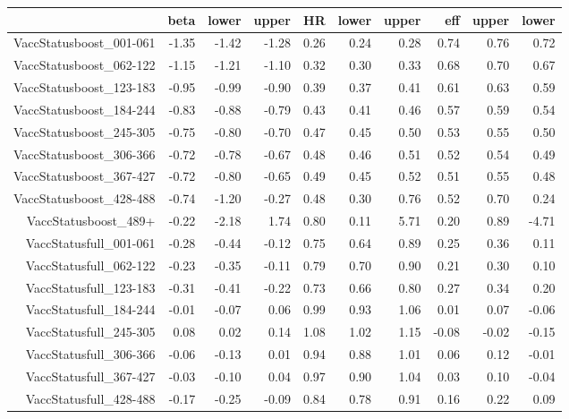 \begin{table}[ht]
\centering
\begin{tabular}{rrrrrrrrrr}
  \hline
 & beta & lower & upper & HR & lower & upper & eff & upper & lower \\ 
  \hline
VaccStatusboost\_001-061 & -1.35 & -1.42 & -1.28 & 0.26 & 0.24 & 0.28 & 0.74 & 0.76 & 0.72 \\ 
  VaccStatusboost\_062-122 & -1.15 & -1.21 & -1.10 & 0.32 & 0.30 & 0.33 & 0.68 & 0.70 & 0.67 \\ 
  VaccStatusboost\_123-183 & -0.95 & -0.99 & -0.90 & 0.39 & 0.37 & 0.41 & 0.61 & 0.63 & 0.59 \\ 
  VaccStatusboost\_184-244 & -0.83 & -0.88 & -0.79 & 0.43 & 0.41 & 0.46 & 0.57 & 0.59 & 0.54 \\ 
  VaccStatusboost\_245-305 & -0.75 & -0.80 & -0.70 & 0.47 & 0.45 & 0.50 & 0.53 & 0.55 & 0.50 \\ 
  VaccStatusboost\_306-366 & -0.72 & -0.78 & -0.67 & 0.48 & 0.46 & 0.51 & 0.52 & 0.54 & 0.49 \\ 
  VaccStatusboost\_367-427 & -0.72 & -0.80 & -0.65 & 0.49 & 0.45 & 0.52 & 0.51 & 0.55 & 0.48 \\ 
  VaccStatusboost\_428-488 & -0.74 & -1.20 & -0.27 & 0.48 & 0.30 & 0.76 & 0.52 & 0.70 & 0.24 \\ 
  VaccStatusboost\_489+ & -0.22 & -2.18 & 1.74 & 0.80 & 0.11 & 5.71 & 0.20 & 0.89 & -4.71 \\ 
  VaccStatusfull\_001-061 & -0.28 & -0.44 & -0.12 & 0.75 & 0.64 & 0.89 & 0.25 & 0.36 & 0.11 \\ 
  VaccStatusfull\_062-122 & -0.23 & -0.35 & -0.11 & 0.79 & 0.70 & 0.90 & 0.21 & 0.30 & 0.10 \\ 
  VaccStatusfull\_123-183 & -0.31 & -0.41 & -0.22 & 0.73 & 0.66 & 0.80 & 0.27 & 0.34 & 0.20 \\ 
  VaccStatusfull\_184-244 & -0.01 & -0.07 & 0.06 & 0.99 & 0.93 & 1.06 & 0.01 & 0.07 & -0.06 \\ 
  VaccStatusfull\_245-305 & 0.08 & 0.02 & 0.14 & 1.08 & 1.02 & 1.15 & -0.08 & -0.02 & -0.15 \\ 
  VaccStatusfull\_306-366 & -0.06 & -0.13 & 0.01 & 0.94 & 0.88 & 1.01 & 0.06 & 0.12 & -0.01 \\ 
  VaccStatusfull\_367-427 & -0.03 & -0.10 & 0.04 & 0.97 & 0.90 & 1.04 & 0.03 & 0.10 & -0.04 \\ 
  VaccStatusfull\_428-488 & -0.17 & -0.25 & -0.09 & 0.84 & 0.78 & 0.91 & 0.16 & 0.22 & 0.09 \\ 

\end{tabular}
\end{table}
